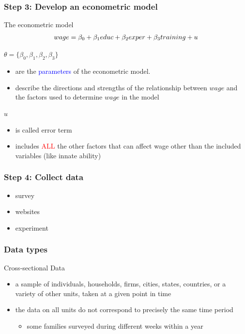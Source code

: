 \documentclass[fleqn]{beamer}\usepackage[]{graphicx}\usepackage[]{color}
\begin{document}
\begin{frame}[c]
  \frametitle{Step 3: Develop an econometric model}
  \begin{block}{The econometric model}
  \vspace{-0.6cm}
     \begin{align}
     wage = \beta_0 + \beta_1 educ + \beta_2 exper + \beta_3 training + u \notag
     \end{align}
  \end{block}
  \begin{block}{$\theta=\{\beta_0,\beta_1,\beta_2,\beta_3\}$}
    \begin{itemize}
    \item are the \textcolor{blue}{parameters} of the econometric model.
    \item describe the directions and strengths of the relationship between $wage$ and the factors used to determine $wage$ in the model
    \end{itemize}
  \end{block}
  \begin{block}{$u$}
    \begin{itemize}
      \item is called error term
      \item includes \textcolor{red}{ALL} the other factors that can affect wage other than the included variables (like innate ability)
    \end{itemize}
  \end{block}
\end{frame}

\begin{frame}[c]
  \frametitle{Step 4: Collect data}
  \begin{itemize}
     \item survey
     \item websites
     \item experiment
  \end{itemize}
\end{frame}

\begin{frame}[c]
  \frametitle{Data types}
  \begin{block}{Cross-sectional Data}
  \begin{itemize}
    \item a sample of individuals, households, firms, cities, states, countries, or a variety of other units, taken at a given point in time
    \item the data on all units do not correspond to precisely the same time period
      \begin{itemize}
        \item some families surveyed during different weeks within a year
      \end{itemize}
  \end{itemize}
  \end{block}
\end{frame}
\end{document}
